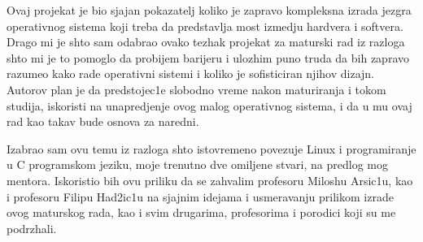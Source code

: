 \documentclass[a4paper,fleqn,12pt]{JMThesis}
\newcommand\eng{\fontencoding{OT1}\fontfamily{\rmdefault}\selectfont}
\begin{document}
\newpage

Ovaj projekat je bio sjajan pokazatelj koliko je zapravo kompleksna izrada
jezgra operativnog sistema koji treba da predstavlja most izmedju hardvera i
softvera. Drago mi je shto sam odabrao ovako tezhak projekat za maturski rad iz
razloga shto mi je to pomoglo da probijem barijeru i ulozhim puno truda da bih
zapravo razumeo kako rade operativni sistemi i koliko je sofisticiran njihov
dizajn.\\

Autorov plan je da predstojec1e slobodno vreme nakon maturiranja i tokom
studija, iskoristi na unapredjenje ovog malog operativnog sistema, i da u mu
ovaj rad kao takav bude osnova za naredni.

Izabrao sam ovu temu iz razloga shto istovremeno povezuje {\eng Linux} i
programiranje u {\eng C} programskom jeziku, moje trenutno dve omiljene stvari,
na predlog mog mentora. Iskoristio bih ovu priliku da se zahvalim profesoru
Miloshu Arsic1u, kao i profesoru Filipu Had2ic1u na sjajnim idejama i
usmeravanju prilikom izrade ovog maturskog rada, kao i svim drugarima,
profesorima i porodici koji su me podrzhali.


\thispagestyle{empty}
\mbox{}
\clearpage

\nocite{*}
\printbibliography[heading=bibintoc,title={Literatura}]
\end{document}
